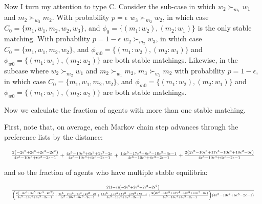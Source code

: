 \documentclass[WP]{AEA}
\begin{document}
Now I turn my attention to type C. Consider the sub-case in which $w_2\succ_{m_1} w_1$ and $m_2\succ_{w_2} m_2$.  With probability $p=\epsilon$ $w_3\succ_{m_2} w_2$, in which case $C_0 =\{m_1,w_1,m_2,w_2, w_3\}$, and $\phi_0=\{(m_1:w_2),(m_2:w_1)\}$ is the only stable matching.  With probability $p=1-\epsilon$ $w_2\succ_{m_2} w_3$, in which case $C_0 =\{m_1,w_1,m_2,w_2\}$, and $\phi_{m0}=\{(m_1:w_2),(m_2:w_1)\}$ and $\phi_{w0}=\{(m_1:w_1),(m_2:w_2)\}$ are both stable matchings.  Likewise, in the subcase where  $w_2\succ_{m_2} w_1$ and $m_2\succ_{w_1} m_2$, $m_3\succ_{w_2} m_2$ with  probability $p=1- \epsilon$, in which case  $C_0 =\{m_1,w_1,m_2,w_2\}$, and $\phi_{m0}=\{(m_1:w_2),(m_2:w_1)\}$ and $\phi_{w0}=\{(m_1:w_1),(m_2:w_2)\}$ are both stable matchings.

Now we calculate the fraction of agents with more than one stable matching.  

First, note that, on average, each Markov chain step advances through the preference lists by the distance:

\begin{equation*}
		\resizebox{\textwidth}{!}{
		$	
			\frac{2 \left(- 2 \epsilon^{6} + 2 \epsilon^{5} + 2 \epsilon^{3} - 2 \epsilon^{2}\right)}{4 \epsilon^{5} - 10 \epsilon^{4} + 6 \epsilon^{3} - 2 \epsilon - 1} + \frac{4 \epsilon^{5} - 10 \epsilon^{4} + 6 \epsilon^{3} + 2 \epsilon^{2} - 2 \epsilon}{4 \epsilon^{5} - 10 \epsilon^{4} + 6 \epsilon^{3} - 2 \epsilon - 1} + \frac{14 \epsilon^{5} - 17 \epsilon^{4} + 8 \epsilon^{3} - 10 \epsilon^{2} + 6 \epsilon - 1}{4 \epsilon^{5} - 10 \epsilon^{4} + 6 \epsilon^{3} - 2 \epsilon - 1} + \frac{2 \left(2 \epsilon^{6} - 16 \epsilon^{5} + 17 \epsilon^{4} - 10 \epsilon^{3} + 10 \epsilon^{2} - 6 \epsilon\right)}{4 \epsilon^{5} - 10 \epsilon^{4} + 6 \epsilon^{3} - 2 \epsilon - 1}
		$
	}
\end{equation*}

and so the fraction of agents who have multiple stable equilibria:

\begin{equation*}
	\resizebox{\textwidth}{!}{
	$
			\frac{2 \left(1 - \epsilon\right) \left(- 2 \epsilon^{6} + 2 \epsilon^{5} + 2 \epsilon^{3} - 2 \epsilon^{2}\right)}{\left(\frac{2 \left(- 2 \epsilon^{6} + 2 \epsilon^{5} + 2 \epsilon^{3} - 2 \epsilon^{2}\right)}{4 \epsilon^{5} - 10 \epsilon^{4} + 6 \epsilon^{3} - 2 \epsilon - 1} + \frac{4 \epsilon^{5} - 10 \epsilon^{4} + 6 \epsilon^{3} + 2 \epsilon^{2} - 2 \epsilon}{4 \epsilon^{5} - 10 \epsilon^{4} + 6 \epsilon^{3} - 2 \epsilon - 1} + \frac{14 \epsilon^{5} - 17 \epsilon^{4} + 8 \epsilon^{3} - 10 \epsilon^{2} + 6 \epsilon - 1}{4 \epsilon^{5} - 10 \epsilon^{4} + 6 \epsilon^{3} - 2 \epsilon - 1} + \frac{2 \left(2 \epsilon^{6} - 16 \epsilon^{5} + 17 \epsilon^{4} - 10 \epsilon^{3} + 10 \epsilon^{2} - 6 \epsilon\right)}{4 \epsilon^{5} - 10 \epsilon^{4} + 6 \epsilon^{3} - 2 \epsilon - 1}\right) \left(4 \epsilon^{5} - 10 \epsilon^{4} + 6 \epsilon^{3} - 2 \epsilon - 1\right)}
	$
}
\end{equation*}
\end{document}
